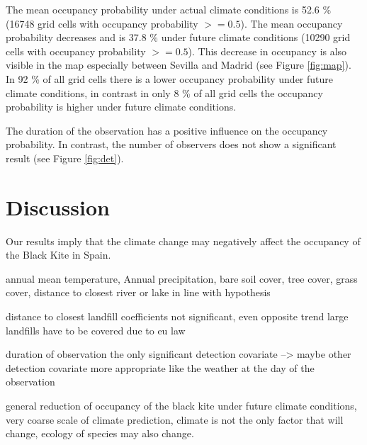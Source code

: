 \begin{multicols}{2}
The mean occupancy probability under actual climate conditions is 52.6 \% (16748 grid cells with occupancy probability $>= 0.5$). The mean occupancy probability decreases and is 37.8 \% under future climate conditions (10290 grid cells with occupancy probability $>= 0.5$). This decrease in occupancy is also visible in the map especially between Sevilla and Madrid (see Figure \ref{fig:map}). In 92 \% of all grid cells there is a lower occupancy probability under future climate conditions, in contrast in only 8 \% of all grid cells the occupancy probability is higher under future climate conditions.

The duration of the observation has a positive influence on the occupancy probability. In contrast, the number of observers does not show a significant result (see Figure \ref{fig:det}).     



\section{Discussion}
Our results imply that the climate change may negatively affect the occupancy of the Black Kite in Spain. 



annual mean temperature, Annual precipitation, bare soil cover, tree cover, grass cover, distance to closest river or lake in line with hypothesis

distance to closest landfill coefficients not significant, even opposite trend 
large landfills have to be covered due to eu law


duration of observation the only significant detection covariate --> maybe other detection covariate more appropriate like the weather at the day of the observation

general reduction of occupancy of the black kite under future climate conditions, very coarse scale of climate prediction, climate is not the only factor that will change, ecology of species may also change.







\end{multicols}